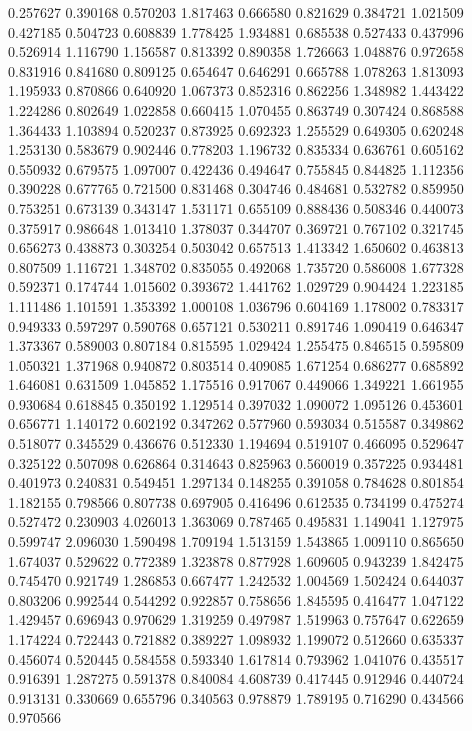 0.257627
0.390168
0.570203
1.817463
0.666580
0.821629
0.384721
1.021509
0.427185
0.504723
0.608839
1.778425
1.934881
0.685538
0.527433
0.437996
0.526914
1.116790
1.156587
0.813392
0.890358
1.726663
1.048876
0.972658
0.831916
0.841680
0.809125
0.654647
0.646291
0.665788
1.078263
1.813093
1.195933
0.870866
0.640920
1.067373
0.852316
0.862256
1.348982
1.443422
1.224286
0.802649
1.022858
0.660415
1.070455
0.863749
0.307424
0.868588
1.364433
1.103894
0.520237
0.873925
0.692323
1.255529
0.649305
0.620248
1.253130
0.583679
0.902446
0.778203
1.196732
0.835334
0.636761
0.605162
0.550932
0.679575
1.097007
0.422436
0.494647
0.755845
0.844825
1.112356
0.390228
0.677765
0.721500
0.831468
0.304746
0.484681
0.532782
0.859950
0.753251
0.673139
0.343147
1.531171
0.655109
0.888436
0.508346
0.440073
0.375917
0.986648
1.013410
1.378037
0.344707
0.369721
0.767102
0.321745
0.656273
0.438873
0.303254
0.503042
0.657513
1.413342
1.650602
0.463813
0.807509
1.116721
1.348702
0.835055
0.492068
1.735720
0.586008
1.677328
0.592371
0.174744
1.015602
0.393672
1.441762
1.029729
0.904424
1.223185
1.111486
1.101591
1.353392
1.000108
1.036796
0.604169
1.178002
0.783317
0.949333
0.597297
0.590768
0.657121
0.530211
0.891746
1.090419
0.646347
1.373367
0.589003
0.807184
0.815595
1.029424
1.255475
0.846515
0.595809
1.050321
1.371968
0.940872
0.803514
0.409085
1.671254
0.686277
0.685892
1.646081
0.631509
1.045852
1.175516
0.917067
0.449066
1.349221
1.661955
0.930684
0.618845
0.350192
1.129514
0.397032
1.090072
1.095126
0.453601
0.656771
1.140172
0.602192
0.347262
0.577960
0.593034
0.515587
0.349862
0.518077
0.345529
0.436676
0.512330
1.194694
0.519107
0.466095
0.529647
0.325122
0.507098
0.626864
0.314643
0.825963
0.560019
0.357225
0.934481
0.401973
0.240831
0.549451
1.297134
0.148255
0.391058
0.784628
0.801854
1.182155
0.798566
0.807738
0.697905
0.416496
0.612535
0.734199
0.475274
0.527472
0.230903
4.026013
1.363069
0.787465
0.495831
1.149041
1.127975
0.599747
2.096030
1.590498
1.709194
1.513159
1.543865
1.009110
0.865650
1.674037
0.529622
0.772389
1.323878
0.877928
1.609605
0.943239
1.842475
0.745470
0.921749
1.286853
0.667477
1.242532
1.004569
1.502424
0.644037
0.803206
0.992544
0.544292
0.922857
0.758656
1.845595
0.416477
1.047122
1.429457
0.696943
0.970629
1.319259
0.497987
1.519963
0.757647
0.622659
1.174224
0.722443
0.721882
0.389227
1.098932
1.199072
0.512660
0.635337
0.456074
0.520445
0.584558
0.593340
1.617814
0.793962
1.041076
0.435517
0.916391
1.287275
0.591378
0.840084
4.608739
0.417445
0.912946
0.440724
0.913131
0.330669
0.655796
0.340563
0.978879
1.789195
0.716290
0.434566
0.970566
